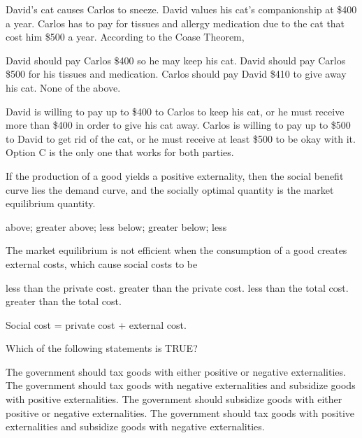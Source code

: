 \documentclass[addpoints,11pt]{exam}
\theoremstyle{definition}
\newcommand{\blank}[0]{\underline{\hspace{3cm}}}
\begin{document}
\begin{questions}
	
	\question David's cat causes Carlos to sneeze. David values his cat's companionship at \$400 a year. Carlos has to pay for tissues and allergy medication due to the cat that cost him \$500 a year. According to the Coase Theorem,
	
	\begin{choices}
		\choice David should pay Carlos \$400 so he may keep his cat.
		\choice David should pay Carlos \$500 for his tissues and medication.
		\CorrectChoice Carlos should pay David \$410 to give away his cat.
		\choice None of the above.
	\end{choices}
	
	\begin{solution}
		David is willing to pay up to \$400 to Carlos to keep his cat, or he must receive more than \$400 in order to give his cat away. Carlos is willing to pay up to \$500 to David to get rid of the cat, or he must receive at least \$500 to be okay with it. Option C is the only one that works for both parties.
	\end{solution}
	
	
	\question If the production of a good yields a positive externality, then the social benefit curve lies \blank the demand curve, and the socially optimal quantity is \blank the market equilibrium quantity.
	
	\begin{choices}
		\CorrectChoice above; greater
		\choice above; less
		\choice below; greater
		\choice below; less
	\end{choices}
	

	\question The market equilibrium is not efficient when the consumption of a good creates external costs, which cause social costs to be 
	
	\begin{choices}
		\choice less than the private cost.
		\CorrectChoice greater than the private cost.
		\choice less than the total cost.
		\choice greater than the total cost.
	\end{choices}
	
	\begin{solution} 
		Social cost = private cost + external cost.
	\end{solution}
	
\newpage
	
\question Which of the following statements is TRUE?

\begin{choices}
	\choice The government should tax goods with either positive or negative externalities.
	\CorrectChoice The government should tax goods with negative externalities and subsidize goods with positive externalities.
	\choice The government should subsidize goods with either positive or negative externalities.
	\choice The government should tax goods with positive externalities and subsidize goods with negative externalities.
\end{choices}


\end{questions}
\end{document}
